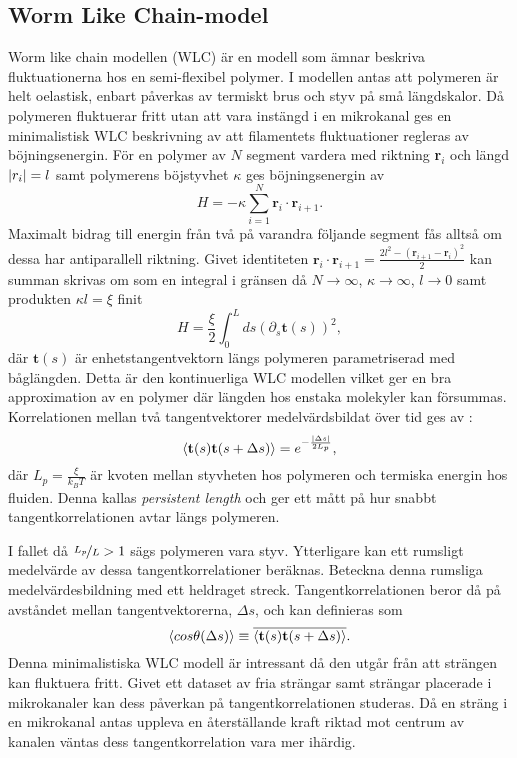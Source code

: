 \subsection{Worm Like Chain-model}
Worm like chain modellen \cite{Milstein2013} (WLC) är en modell som ämnar beskriva fluktuationerna hos en semi-flexibel polymer. I modellen antas att polymeren är helt oelastisk, enbart påverkas av termiskt brus och styv på små längdskalor. Då polymeren fluktuerar fritt utan att vara instängd i en mikrokanal ges en minimalistisk WLC beskrivning av att filamentets fluktuationer regleras av böjningsenergin. För en polymer av $N$ segment vardera med riktning \textbf{r}$_i$ och längd $\abs{r_{i}}=l$ samt polymerens böjstyvhet $\kappa$ ges böjningsenergin av 
\begin{equation}
    H = -\kappa\sum_{i=1}^{N}\textbf{r}_{i}\cdot \textbf{r}_{i+1}.
\end{equation}
Maximalt bidrag till energin från två på varandra följande segment fås alltså om dessa har antiparallell riktning. Givet identiteten $\textbf{r}_{i}\cdot\textbf{r}_{i+1}=\frac{2l^2-(\textbf{r}_{i+1}-\textbf{r}_{i})^2}{2}$ kan summan skrivas om som en integral i gränsen då $N \rightarrow \infty$, $\kappa\to\infty$, $l \rightarrow 0$ samt produkten $\kappa l=\xi$ finit 
\begin{equation}\label{böj}
    H=\frac{\xi}{2}\int_{0}^{L}ds(\partial_{s}\textbf{t}(s))^2,
\end{equation}
där $\textbf{t}(s)$ är enhetstangentvektorn längs polymeren parametriserad med båglängden. Detta är den kontinuerliga WLC modellen \cite{Fixman_WLC1973} vilket ger en bra approximation av en polymer där längden hos enstaka molekyler kan försummas.  Korrelationen mellan två tangentvektorer medelvärdsbildat över tid ges av \cite{Landau1958}:
\begin{equation}
\ev{\textbf{t}(s)\textbf{t}(s+\Delta s)}=e^{-\frac{\abs{\Delta s}}{2L_{p}}},
\end{equation}
där $L_{p}=\frac{\xi}{k_{B}T}$ är kvoten mellan styvheten hos polymeren och termiska energin hos fluiden. Denna kallas \emph{persistent length} och ger ett mått på hur snabbt tangentkorrelationen avtar längs polymeren. 

I fallet då $\nicefrac{L_{p}}{L}>1$ sägs polymeren vara styv. Ytterligare kan ett rumsligt medelvärde av dessa tangentkorrelationer beräknas. Beteckna denna rumsliga medelvärdesbildning med ett heldraget streck. Tangentkorrelationen beror då på avståndet mellan tangentvektorerna, $\Delta s$, och kan definieras som
\begin{equation}
\label{tangkorr}
    \ev{cos\theta(\Delta s)}\equiv\overline{\ev{\mathbf{t}(s)\mathbf{t}(s+\Delta s)}}.
\end{equation}
Denna minimalistiska WLC modell är intressant då den utgår från att strängen kan fluktuera fritt. Givet ett dataset av fria strängar samt strängar placerade i mikrokanaler kan dess påverkan på tangentkorrelationen studeras. Då en sträng i en mikrokanal antas uppleva en återställande kraft riktad mot centrum av kanalen väntas dess tangentkorrelation vara mer ihärdig.

